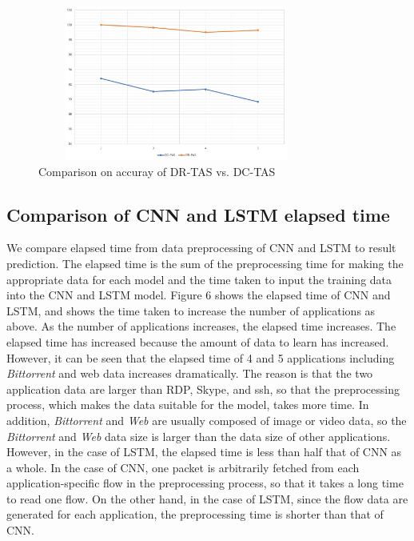 \documentclass[10pt, twoside, jounal]{IEEEtran}
\begin{document}
\begin{figure}[!t]
\centering
\setlength{\abovecaptionskip}{0pt}
\setlength{\belowcaptionskip}{0pt}
{
\includegraphics[width=3.6in, height=2.0in]{fig6.jpg}
\caption{Comparison on accuray of DR-TAS vs. DC-TAS }
\label{fig6}
}
\end{figure}

\subsection{Comparison of CNN and LSTM elapsed time}
We compare elapsed time from data preprocessing of CNN and LSTM to result prediction.
The elapsed time is the sum of the preprocessing time for making the appropriate data for each model and the time taken to input the training data into the CNN and LSTM model.
Figure 6 shows the elapsed time of CNN and LSTM, and shows the time taken to increase the number of applications as above.
As the number of applications increases, the elapsed time increases.
The elapsed time has increased because the amount of data to learn has increased.
However, it can be seen that the elapsed time of 4 and 5 applications including {\it Bittorrent} and web data increases
dramatically.
The reason is that the two application data are larger than RDP, Skype, and ssh, so that the preprocessing process, which makes the data suitable for the model, takes more time.
In addition, {\it Bittorrent} and {\it Web} are usually composed of image or video data, so the {\it Bittorrent} and {\it Web} data size is larger than the data size of other applications.
However, in the case of LSTM, the elapsed time is less than half that of CNN as a whole.
In the case of CNN, one packet is arbitrarily fetched from each application-specific flow in the preprocessing process, so that it takes a long time to read one flow.
On the other hand, in the case of LSTM, since the flow data are generated for each application, the preprocessing time
is shorter than that of CNN.
\end{document}
